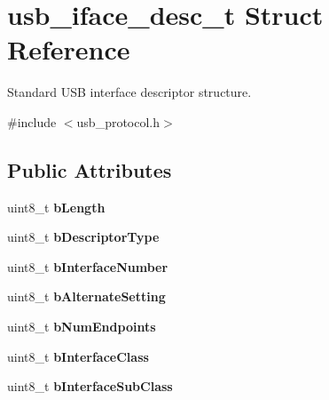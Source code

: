 \hypertarget{structusb__iface__desc__t}{\section{usb\-\_\-iface\-\_\-desc\-\_\-t Struct Reference}
\label{structusb__iface__desc__t}
}


Standard U\-S\-B interface descriptor structure.  




{\ttfamily \#include $<$usb\-\_\-protocol.\-h$>$}

\subsection*{Public Attributes}
\begin{DoxyCompactItemize}
\item 
\hypertarget{structusb__iface__desc__t_ac1a5ca3d8e481aabfabfecb92727eede}{uint8\-\_\-t {\bfseries b\-Length}}\label{structusb__iface__desc__t_ac1a5ca3d8e481aabfabfecb92727eede}

\item 
\hypertarget{structusb__iface__desc__t_afa98c630cd3015ed3b1795f1ad24a508}{uint8\-\_\-t {\bfseries b\-Descriptor\-Type}}\label{structusb__iface__desc__t_afa98c630cd3015ed3b1795f1ad24a508}

\item 
\hypertarget{structusb__iface__desc__t_a7e39e94123157feab346546e3034d166}{uint8\-\_\-t {\bfseries b\-Interface\-Number}}\label{structusb__iface__desc__t_a7e39e94123157feab346546e3034d166}

\item 
\hypertarget{structusb__iface__desc__t_af26f8d8edc08cb2c5fb61c51fdb06a25}{uint8\-\_\-t {\bfseries b\-Alternate\-Setting}}\label{structusb__iface__desc__t_af26f8d8edc08cb2c5fb61c51fdb06a25}

\item 
\hypertarget{structusb__iface__desc__t_aae7be1499654d689018b8c450b86f574}{uint8\-\_\-t {\bfseries b\-Num\-Endpoints}}\label{structusb__iface__desc__t_aae7be1499654d689018b8c450b86f574}

\item 
\hypertarget{structusb__iface__desc__t_a2d812b3326e8aafcfd03c71b72ea8d40}{uint8\-\_\-t {\bfseries b\-Interface\-Class}}\label{structusb__iface__desc__t_a2d812b3326e8aafcfd03c71b72ea8d40}

\item 
\hypertarget{structusb__iface__desc__t_a023635bd8337ab81717bae41de80ff06}{uint8\-\_\-t {\bfseries b\-Interface\-Sub\-Class}}\label{structusb__iface__desc__t_a023635bd8337ab81717bae41de80ff06}


\end{DoxyCompactItemize}
